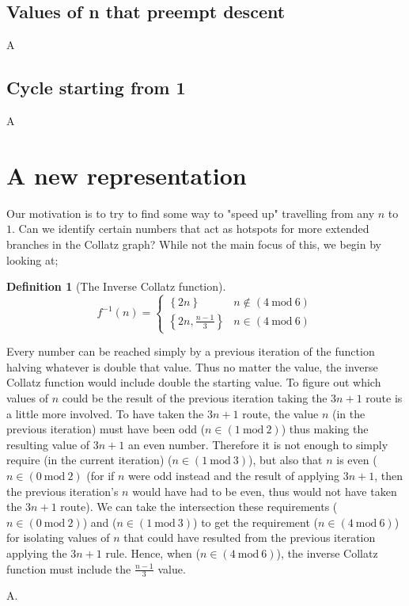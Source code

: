 \documentclass[12pt,a4paper]{amsart}
\numberwithin{equation}{section}
\theoremstyle{plain}
\theoremstyle{definition}
\newtheorem{Def}[Th]{Definition}
\begin{document}
\subsection{Values of n that preempt descent}

A

\subsection{Cycle starting from 1}

A

\section{A new representation}

Our motivation is to try to find some way to "speed up" travelling from any $n$ to $1$. Can we identify certain numbers that act as hotspots for more extended branches in the Collatz graph? While not the main focus of this, we begin by looking at;

\begin{Def}[The Inverse Collatz function]
\begin{equation}
f^{-1} \left ( n \right )=\left\{\begin{matrix}
\left \{ 2n \right \} & n \notin \left ( 4\:\mathrm{mod}\:6 \right ) \\ 
\left \{ 2n, \frac{n-1}{3} \right \} & n \in \left ( 4\:\mathrm{mod}\:6 \right )
\end{matrix}\right.
\end{equation}
\end{Def}

Every number can be reached simply by a previous iteration of the function halving whatever is double that value. Thus no matter the value, the inverse Collatz function would include double the starting value. To figure out which values of $n$ could be the result of the previous iteration taking the $3n+1$ route is a little more involved. To have taken the $3n+1$ route, the value $n$ (in the previous iteration) must have been odd ($n \in \left ( 1\:\mathrm{mod}\:2 \right )$) thus making the resulting value of $3n+1$ an even number. Therefore it is not enough to simply require (in the current iteration) ($n \in \left ( 1\:\mathrm{mod}\:3 \right )$), but also that $n$ is even ($n \in \left ( 0\:\mathrm{mod}\:2 \right )$ (for if $n$ were odd instead and the result of applying $3n+1$, then the previous iteration's $n$ would have had to be even, thus would not have taken the $3n+1$ route). We can take the intersection these requirements ($n \in \left ( 0\:\mathrm{mod}\:2 \right )$) and ($n \in \left ( 1\:\mathrm{mod}\:3 \right )$) to get the requirement ($n \in \left ( 4\:\mathrm{mod}\:6 \right )$) for isolating values of $n$ that could have resulted from the previous iteration applying the $3n+1$ rule. Hence, when ($n \in \left ( 4\:\mathrm{mod}\:6 \right )$), the inverse Collatz function must include the $\frac{n-1}{3}$ value.

A.
\end{document}
